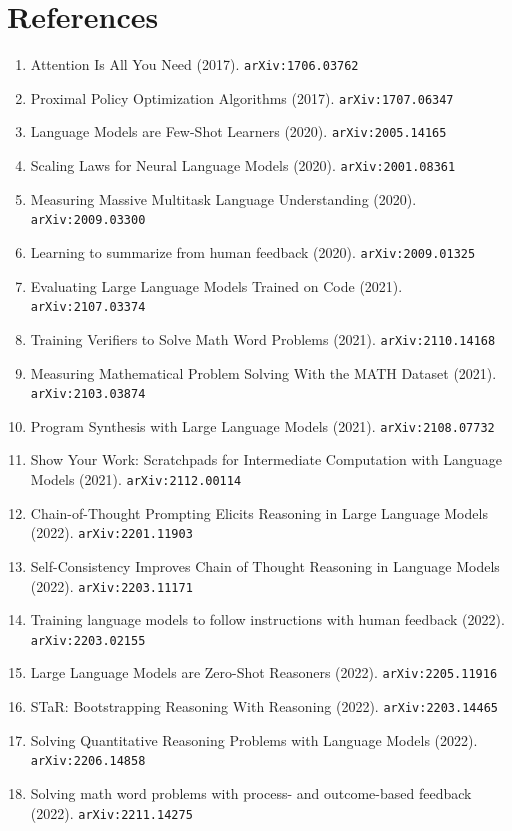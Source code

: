 \documentclass[11pt]{article}
\begin{document}
\section*{References}
\begin{enumerate}\small
  \item Attention Is All You Need (2017). \texttt{arXiv:1706.03762}
  \item Proximal Policy Optimization Algorithms (2017). \texttt{arXiv:1707.06347}
  \item Language Models are Few-Shot Learners (2020). \texttt{arXiv:2005.14165}
  \item Scaling Laws for Neural Language Models (2020). \texttt{arXiv:2001.08361}
  \item Measuring Massive Multitask Language Understanding (2020). \texttt{arXiv:2009.03300}
  \item Learning to summarize from human feedback (2020). \texttt{arXiv:2009.01325}
  \item Evaluating Large Language Models Trained on Code (2021). \texttt{arXiv:2107.03374}
  \item Training Verifiers to Solve Math Word Problems (2021). \texttt{arXiv:2110.14168}
  \item Measuring Mathematical Problem Solving With the MATH Dataset (2021). \texttt{arXiv:2103.03874}
  \item Program Synthesis with Large Language Models (2021). \texttt{arXiv:2108.07732}
  \item Show Your Work: Scratchpads for Intermediate Computation with Language
  Models (2021). \texttt{arXiv:2112.00114}
  \item Chain-of-Thought Prompting Elicits Reasoning in Large Language Models (2022). \texttt{arXiv:2201.11903}
  \item Self-Consistency Improves Chain of Thought Reasoning in Language Models (2022). \texttt{arXiv:2203.11171}
  \item Training language models to follow instructions with human feedback (2022). \texttt{arXiv:2203.02155}
  \item Large Language Models are Zero-Shot Reasoners (2022). \texttt{arXiv:2205.11916}
  \item STaR: Bootstrapping Reasoning With Reasoning (2022). \texttt{arXiv:2203.14465}
  \item Solving Quantitative Reasoning Problems with Language Models (2022). \texttt{arXiv:2206.14858}
  \item Solving math word problems with process- and outcome-based feedback (2022). \texttt{arXiv:2211.14275}

\end{enumerate}
\end{document}
